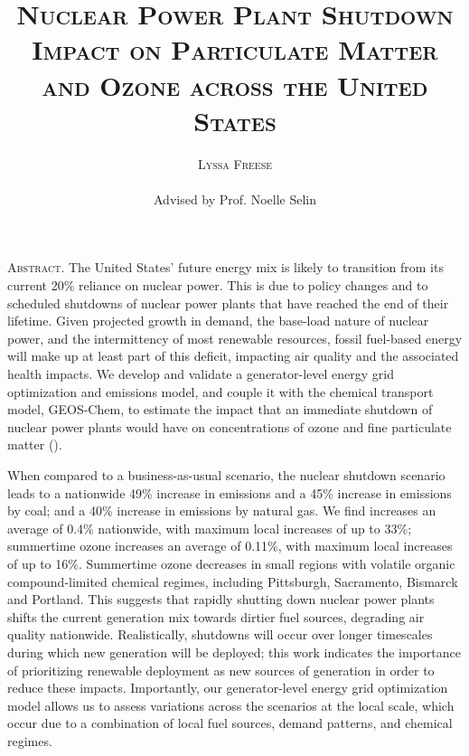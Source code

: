 \documentclass[12]{article}
\title{{\textsc{\Large Nuclear Power Plant Shutdown Impact on Particulate Matter and Ozone across the United States}}}
\author{\textsc{Lyssa Freese}
\\\\
Advised by Prof. Noelle Selin}
\begin{document}
\maketitle
\thispagestyle{empty}

\setlength{\leftskip}{1.1cm}
\setlength{\rightskip}{1.1cm}


\bigskip
\bigskip

{\textsc{Abstract.} 
The United States’ future energy mix is likely to transition from its current 20\% reliance on nuclear power. This is due to policy changes and to scheduled shutdowns of nuclear power plants that have reached the end of their lifetime. Given projected growth in demand, the base-load nature of nuclear power, and the intermittency of most renewable resources, fossil fuel-based energy will make up at least part of this deficit, impacting air quality and the associated health impacts. We develop and validate a generator-level energy grid optimization and emissions model, and couple it with the chemical transport model, GEOS-Chem, to estimate the impact that an immediate shutdown of nuclear power plants would have on concentrations of ozone and fine particulate matter ().

When compared to a business-as-usual scenario, the nuclear shutdown scenario leads to a nationwide 49\% increase in  emissions and a 45\% increase in  emissions by coal; and a 40\% increase in  emissions by natural gas. We find  increases an average of 0.4\% nationwide, with maximum local increases of up to 33\%; summertime ozone increases an average of 0.11\%, with maximum local increases of up to 16\%. Summertime ozone decreases in small regions with volatile organic compound-limited chemical regimes, including Pittsburgh, Sacramento, Bismarck and Portland. This suggests that rapidly shutting down nuclear power plants shifts the current generation mix towards dirtier fuel sources, degrading air quality nationwide. Realistically, shutdowns will occur over longer timescales during which new generation will be deployed; this work indicates the importance of prioritizing renewable deployment as new sources of generation in order to reduce these impacts. Importantly, our generator-level energy grid optimization model allows us to assess variations across the scenarios at the local scale, which occur due to a combination of local fuel sources, demand patterns, and chemical regimes.}

\bigskip
\bigskip 
\clearpage
\setcounter{page}{1}
\end{document}
